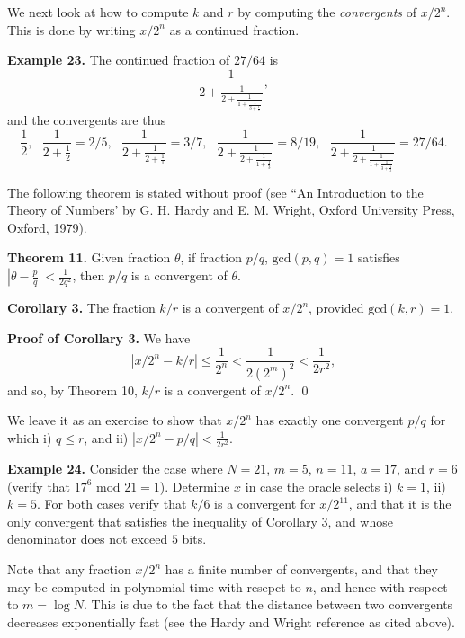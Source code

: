 \documentclass [12pt]{article}
\theoremstyle{definition}
\begin{document}
We next look at how to compute $k$ and $r$ by computing the \textit{convergents} of $x/2^n$. This is done by writing $x/2^n$ as a continued fraction.

\newpage
\textbf{Example 23.} The continued fraction of $27/64$ is 
\[\frac{1}{2+\frac{1}{2+\frac{1}{1+\frac{1}{3+\frac{1}{3}}}}},\]
and the convergents are thus 
\[\frac{1}{2}, \mbox{  } \frac{1}{2+\frac{1}{2}} = 2/5, \mbox{  } \frac{1}{2+\frac{1}{2+\frac{1}{1}}} = 3/7,  \mbox{  }\frac{1}{2+\frac{1}{2+\frac{1}{1+\frac{1}{3}}}} = 8/19, 
 \mbox{  } \frac{1}{2+\frac{1}{2+\frac{1}{1+\frac{1}{3+\frac{1}{3}}}}} = 27/64.\]

\newpage
The following theorem is stated without proof (see ``An Introduction to the Theory of Numbers' by G. H. Hardy and E. M. Wright, 
Oxford University Press, Oxford, 1979).

\textbf{Theorem 11.} Given fraction $\theta$, if fraction $p/q$, $\mbox{gcd}(p,q)=1$ satisfies $|\theta - \frac{p}{q}| < \frac{1}{2q^2}$, then $p/q$ is a convergent of $\theta$.

\textbf{Corollary 3.} The fraction $k/r$ is a convergent of $x/2^n$, provided $\mbox{gcd}(k,r)=1$.

\textbf{Proof of Corollary 3.} We have 
\[|x/2^n-k/r| \leq \frac{1}{2^n} < \frac{1}{2(2^m)^2} < \frac{1}{2r^2},\]
and so, by Theorem 10, $k/r$ is a convergent of $x/2^n$. \qed

We leave it as an exercise to show that $x/2^n$ has exactly one convergent $p/q$ for which i) $q \leq r$, and ii) 
$|x/2^n-p/q| < \frac{1}{2r^2}$. 


\textbf{Example 24.} Consider the case where $N=21$, $m=5$, $n=11$, $a=17$, and $r=6$ (verify that $17^6 \mbox{ mod } 21 = 1$). Determine $x$ in case the oracle selects
i) $k=1$, ii) $k=5$. For both cases verify that $k/6$ is a convergent for $x/2^{11}$, and that it is the only convergent that satisfies the inequality of Corollary 3, and 
whose denominator does not exceed $5$ bits. 







\newpage
Note that any fraction $x/2^n$ has a finite number of convergents, and that they may be computed in polynomial time with resepct to $n$, and hence with respect to $m=\log N$.
This is due to the fact that the distance between two convergents decreases exponentially fast (see the Hardy and Wright reference as cited above).
\end{document}
